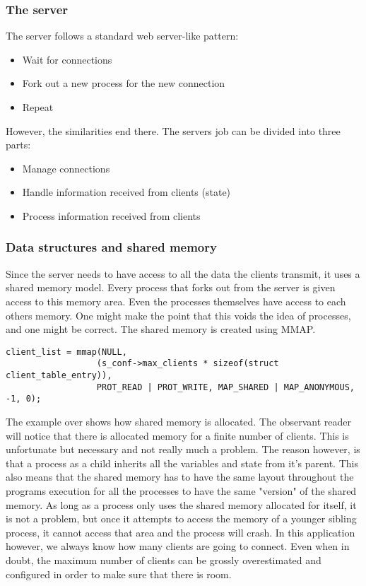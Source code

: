 \documentclass[12pt,english,a4paper]{report}
\begin{document}
\subsubsection{The server}
The server follows a standard web server-like pattern:
\begin{itemize}
  \item Wait for connections
  \item Fork out a new process for the new connection
  \item Repeat
\end{itemize}
However, the similarities end there. The servers job can be divided into three parts:
\begin{itemize}
  \item Manage connections
  \item Handle information received from clients (state)
  \item Process information received from clients
\end{itemize}
\subsubsection{Data structures and shared memory}
Since the server needs to have access to all the data the clients transmit, it uses a shared memory model. Every process that forks out from the server is given access to this memory area. Even the processes themselves have access to each others memory. One might make the point that this voids the idea of processes, and one might be correct. The shared memory is created using MMAP.
\begin{lstlisting}
client_list = mmap(NULL, 
                  (s_conf->max_clients * sizeof(struct client_table_entry)), 
                  PROT_READ | PROT_WRITE, MAP_SHARED | MAP_ANONYMOUS, -1, 0);
\end{lstlisting}
The example over shows how shared memory is allocated. The observant reader will notice that there is allocated memory for a finite number of clients. This is unfortunate but necessary and not really much a problem. The reason however, is that a process as a child inherits all the variables and state from it's parent. This also means that the shared memory has to have the same layout throughout the programs execution for all the processes to have the same "version" of the shared memory. As long as a process only uses the shared memory allocated for itself, it is not a problem, but once it attempts to access the memory of a younger sibling process, it cannot access that area and the process will crash. In this application however, we always know how many clients are going to connect. Even when in doubt, the maximum number of clients can be grossly overestimated and configured in order to make sure that there is room.
\end{document}
